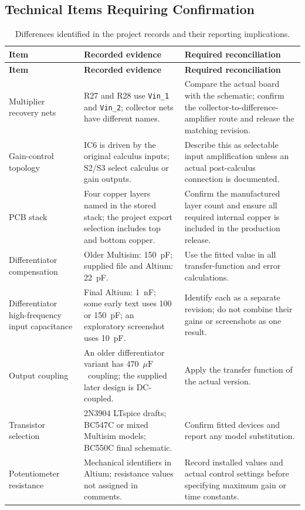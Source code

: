 \documentclass[11pt,a4paper]{article}
\newcommand{\uF}{\ensuremath{\mu\mathrm{F}}}
\begin{document}
\subsection{Technical Items Requiring Confirmation}
\begin{longtable}{P{0.21\textwidth}P{0.36\textwidth}P{0.34\textwidth}}
\caption{Differences identified in the project records and their reporting implications.}\\
\toprule\textbf{Item} & \textbf{Recorded evidence} & \textbf{Required reconciliation}\\\midrule\endfirsthead
\toprule\textbf{Item} & \textbf{Recorded evidence} & \textbf{Required reconciliation}\\\midrule\endhead
Multiplier recovery nets & R27 and R28 use \texttt{Vin\_\allowbreak{}1} and \texttt{Vin\_\allowbreak{}2}; collector nets have different names. & Compare the actual board with the schematic; confirm the collector-to-difference-amplifier route and release the matching revision.\\
Gain-control topology & IC6 is driven by the original calculus inputs; S2/S3 select calculus or gain outputs. & Describe this as selectable input amplification unless an actual post-calculus connection is documented.\\
PCB stack & Four copper layers named in the stored stack; the project export selection includes top and bottom copper. & Confirm the manufactured layer count and ensure all required internal copper is included in the production release.\\
Differentiator compensation & Older Multisim: 150~pF; supplied file and Altium: 22~pF. & Use the fitted value in all transfer-function and error calculations.\\
Differentiator high-frequency input capacitance & Final Altium: 1~nF; some early text uses 100 or 150~pF; an exploratory screenshot uses 10~pF. & Identify each as a separate revision; do not combine their gains or screenshots as one result.\\
Output coupling & An older differentiator variant has 470~\uF\ coupling; the supplied later design is DC-coupled. & Apply the transfer function of the actual version.\\
Transistor selection & 2N3904 LTspice drafts; BC547C or mixed Multisim models; BC550C final schematic. & Confirm fitted devices and report any model substitution.\\
Potentiometer resistance & Mechanical identifiers in Altium; resistance values not assigned in comments. & Record installed values and actual control settings before specifying maximum gain or time constants.\\

\end{longtable}
\end{document}
